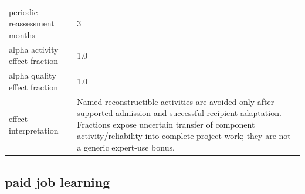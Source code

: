 \documentclass[10pt]{article}
\begin{document}
\begin{longtable}{p{.44\linewidth}p{.50\linewidth}}
periodic reassessment months & 3\\

alpha activity effect fraction & 1.0\\

alpha quality effect fraction & 1.0\\

effect interpretation & Named reconstructible activities are avoided only after supported admission and successful recipient adaptation. Fractions expose uncertain transfer of component activity/reliability into complete project work; they are not a generic expert-use bonus.\\

\bottomrule\end{longtable}

\subsection*{paid job learning}
\end{document}
